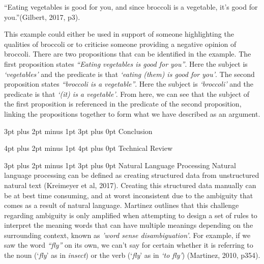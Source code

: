 \documentclass[12pt,a4paper]{article}
\makeatletter
\renewcommand\subsection{\@startsection {subsection}{1}{2mm} %
                               {3pt plus 2pt minus 1pt} %
                               {3pt plus 0pt} %
                               {\normalfont\bfseries}}
\renewcommand\section{\@startsection {section}{1}{0mm} %
                               {4pt plus 2pt minus 1pt} %
                               {4pt plus 0pt} %
                               {\bfseries}}
\makeatother
\begin{document}
``Eating vegetables is good for you, and since broccoli is a vegetable, it's good for you.''(Gilbert, 2017, p3).\newline

This example could either be used in support of someone highlighting the qualities of broccoli or to criticise someone providing a negative opinion of broccoli. There are two propositions that can be identified in the example. The first proposition states \emph{``Eating vegetables is good for you''}. Here the subject is \emph{`vegetables'} and the predicate is that \emph{`eating (them) is good for you'}. The second proposition states \emph{``broccoli is a vegetable''}. Here the subject is \emph{`broccoli'} and the predicate is that \emph{`(it) is a vegetable'}.  From here, we can see that the subject of the first proposition is referenced in the predicate of the second proposition, linking the propositions together to form what we have described as an argument. \newline

\subsection{Conclusion}

\newpage

\section{Technical Review}

\subsection{Natural Language Processing}
Natural language processing can be defined as creating structured data from unstructured natural text (Kreimeyer et al, 2017). Creating this structured data manually can be at best time consuming, and at worst inconsistent due to the ambiguity that comes as a result of natural language. Martinez outlines that this challenge regarding ambiguity is only amplified when attempting to design a set of rules to interpret the meaning words that can have multiple meanings depending on the surrounding context, known as \emph{'word sense disambiguation'}. For example, if we saw the word \emph{``fly''} on its own, we can't say for certain whether it is referring to the noun (`\emph{fly}' as in \emph{insect}) or the verb (`\emph{fly}' as in \emph{`to fly'}) (Martinez, 2010, p354).\newline
\end{document}
